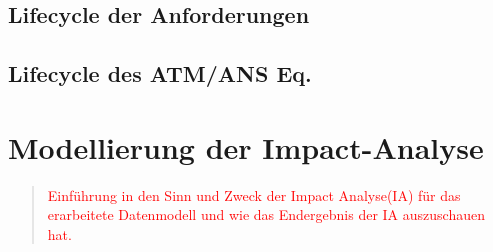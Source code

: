 \subsection{Lifecycle der Anforderungen}
\subsection{Lifecycle des ATM/ANS Eq.}

\pagebreak
\section{Modellierung der Impact-Analyse}

\begin{quote}
\textcolor{red}{Einführung in den Sinn und Zweck der Impact Analyse(IA) für das erarbeitete Datenmodell und wie das Endergebnis der IA auszuschauen hat.}
\end{quote}